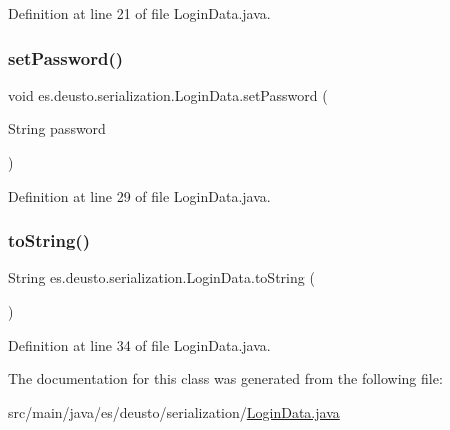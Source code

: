Definition at line 21 of file Login\+Data.\+java.

\mbox{\label{classes_1_1deusto_1_1serialization_1_1_login_data_a8a744db82f9ddad859e04b6069502409}} 
\subsubsection{\texorpdfstring{set\+Password()}{setPassword()}}
{\footnotesize\ttfamily void es.\+deusto.\+serialization.\+Login\+Data.\+set\+Password (\begin{DoxyParamCaption}\item[{String}]{password }\end{DoxyParamCaption})}



Definition at line 29 of file Login\+Data.\+java.

\mbox{\label{classes_1_1deusto_1_1serialization_1_1_login_data_a638424167a2321d58645b31fe9aef420}} 
\subsubsection{\texorpdfstring{to\+String()}{toString()}}
{\footnotesize\ttfamily String es.\+deusto.\+serialization.\+Login\+Data.\+to\+String (\begin{DoxyParamCaption}{ }\end{DoxyParamCaption})}



Definition at line 34 of file Login\+Data.\+java.



The documentation for this class was generated from the following file\+:\begin{DoxyCompactItemize}
\item 
src/main/java/es/deusto/serialization/\hyperlink{_login_data_8java}{Login\+Data.\+java}\end{DoxyCompactItemize}
